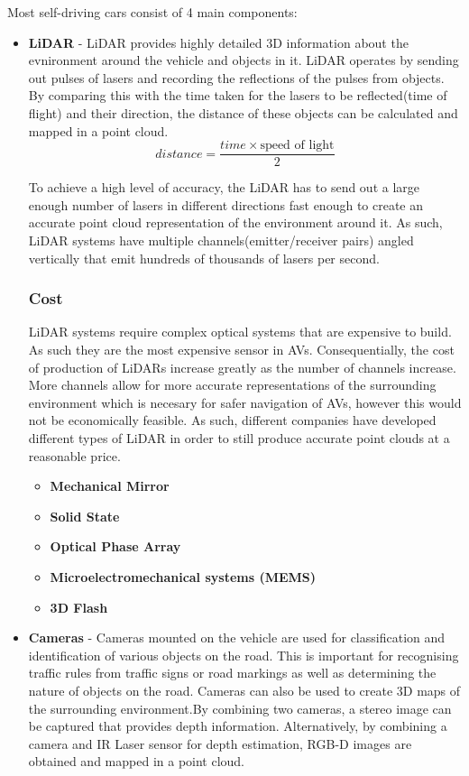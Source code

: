 Most self-driving cars consist of 4 main components: 
\begin{itemize}
	\item \textbf{LiDAR} - LiDAR provides highly detailed 3D information about the evnironment around the vehicle and objects in it. LiDAR operates by sending out pulses of lasers and recording the reflections of the pulses from objects. By comparing this with the time taken for the lasers to be reflected(time of flight) and their direction, the distance of these objects can be calculated and mapped in a point cloud. 
	\begin{equation*}
	distance = \frac{time \times \text{speed of light}}{2}
	\end{equation*}
	
	To achieve a high level of accuracy, the LiDAR has to send out a large enough number of lasers in different directions fast enough to create an accurate point cloud representation of the environment around it. As such, LiDAR systems have multiple channels(emitter/receiver pairs) angled vertically that  emit hundreds of thousands of lasers per second.
	
	\subsubsection{Cost}
	LiDAR systems require complex optical systems that are expensive to build. As such they are the most expensive sensor in AVs. Consequentially, the cost of production of LiDARs increase greatly as the number of channels increase. More channels allow for more accurate representations of the surrounding environment which is necesary for safer navigation of AVs, however this would not be economically feasible. 
	As such, different companies have developed different types of LiDAR in order to still produce accurate point clouds at a reasonable price. 
	
	\begin{itemize}
		\item \textbf{Mechanical Mirror}
		\item \textbf{Solid State}
		\item \textbf{Optical Phase Array}
		\item \textbf{Microelectromechanical systems (MEMS)}
		\item \textbf{3D Flash}
	\end{itemize}
	
	
	\item \textbf{Cameras} - Cameras mounted on the vehicle are used for classification and identification of various objects on the road. This is important for recognising traffic rules from traffic signs or road markings as well as determining the nature of objects on the road. 
	Cameras can also be used to create 3D maps of the surrounding environment.By combining two cameras, a stereo image can be captured that provides depth information. Alternatively, by combining a camera and IR Laser sensor for depth estimation, RGB-D images are obtained and mapped in a point cloud.
	

\end{itemize}
